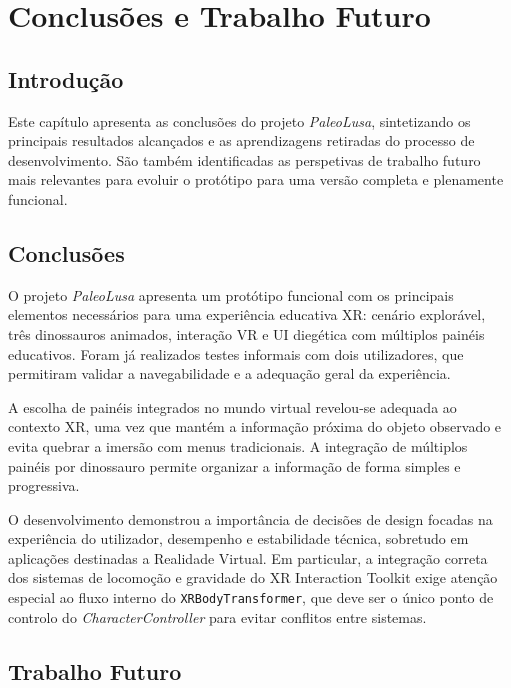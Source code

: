 \documentclass[a4paper,11pt]{report}
\newcommand{\code}[1]{\texttt{#1}}
\newcommand{\blankpage}{%
    \newpage
    \thispagestyle{empty}
    \mbox{}
    \newpage
}
\begin{document}
\blankpage

\chapter{Conclusões e Trabalho Futuro}

\section{Introdução}

Este capítulo apresenta as conclusões do projeto \textit{PaleoLusa},
sintetizando os principais resultados alcançados e as aprendizagens retiradas
do processo de desenvolvimento. São também identificadas as perspetivas de
trabalho futuro mais relevantes para evoluir o protótipo para uma versão
completa e plenamente funcional.

\section{Conclusões}

O projeto \textit{PaleoLusa} apresenta um protótipo funcional com os
principais elementos necessários para uma experiência educativa XR:
cenário explorável, três dinossauros animados, interação VR e UI diegética
com múltiplos painéis educativos. Foram já realizados testes informais com
dois utilizadores, que permitiram validar a navegabilidade e a adequação
geral da experiência.

A escolha de painéis integrados no mundo virtual revelou-se adequada ao
contexto XR, uma vez que mantém a informação próxima do objeto observado e
evita quebrar a imersão com menus tradicionais. A integração de múltiplos
painéis por dinossauro permite organizar a informação de forma simples e
progressiva.

O desenvolvimento demonstrou a importância de decisões de design focadas na
experiência do utilizador, desempenho e estabilidade técnica, sobretudo em
aplicações destinadas a Realidade Virtual. Em particular, a integração correta
dos sistemas de locomoção e gravidade do XR Interaction Toolkit exige atenção
especial ao fluxo interno do \code{XRBodyTransformer}, que deve ser o único
ponto de controlo do \textit{CharacterController} para evitar conflitos entre
sistemas.

\section{Trabalho Futuro}
\end{document}

